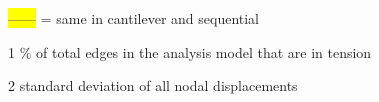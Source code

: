 \begin{landscape}
\begin{table}[h!]
\begin{threeparttable}
			\begin{tablenotes}
				\scriptsize
				 \item[]  \hl{------} = same in cantilever and sequential
				\item[1] \% of total edges in the analysis model that are in tension
				\item[2] standard deviation of all nodal displacements
			\end{tablenotes}
		\end{threeparttable}	
		
		\label{table:experimental_data2}
	\end{table}
	
\end{landscape}


\clearpage
